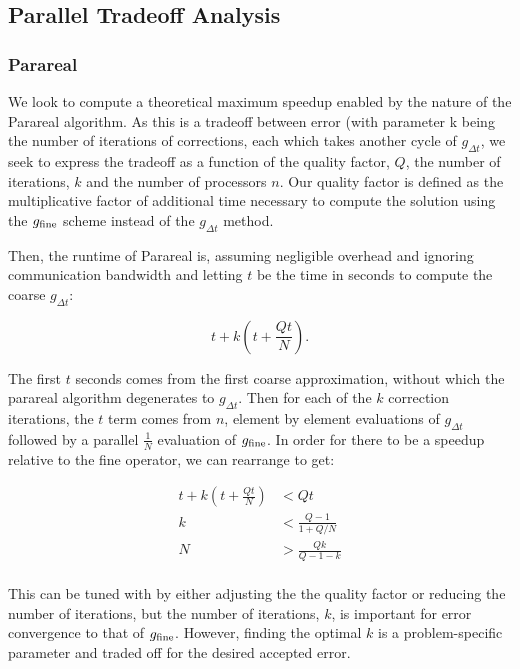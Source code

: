 \documentclass[letterpaper,12pt]{article}
\begin{document}
\subsection{Parallel Tradeoff Analysis}

\subsubsection{Parareal}

We look to compute a theoretical maximum speedup enabled by the nature of the Parareal algorithm.  As this is a tradeoff between error (with parameter k being the number of iterations of corrections, each which takes another cycle of $g_{\Delta t}$, we seek to express the tradeoff as a function of the quality factor, $Q$, the number of iterations, $k$ and the number of processors $n$.  Our quality factor is defined as the multiplicative factor of additional time necessary to compute the solution using the $g_{\textnormal{fine}}$ scheme instead of the $g_{\Delta t}$ method.

Then, the runtime of Parareal is, assuming negligible overhead and ignoring communication bandwidth and letting $t$ be the time in seconds to compute the coarse $g_{\Delta t}$:

\begin{equation}
t + k \left(t + \frac{Qt}{N} \right).
\label{eq:scheme}
\end{equation}

The first $t$ seconds comes from the first coarse approximation, without which the parareal algorithm degenerates to $g_{\Delta t}$.  Then for each of the $k$ correction iterations, the $t$ term comes from $n$, element by element evaluations of  $g_{\Delta t}$ followed by a parallel $\frac{1}{N}$ evaluation of $g_{\textnormal{fine}}$. In order for there to be a speedup relative to the fine operator, we can rearrange to get:

\[
\begin{aligned}
t + k\left( t + \frac{Qt}{N} \right) &< Qt \\
k &< \frac{Q - 1}{1 + Q/N} \\
N &> \frac{Qk}{Q - 1 - k} \\
\end{aligned}
\]

This can be tuned with by either adjusting the the quality factor or reducing the number of iterations, but the number of iterations, $k$, is important for error convergence to that of $g_{\textnormal{fine}}$.  However, finding the optimal $k$ is a problem-specific parameter and traded off for the desired accepted error.
\end{document}
